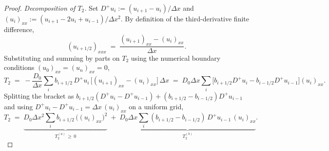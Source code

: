 \documentclass[10pt,a4paper]{amsart}
\begin{document}
\begin{proof}
    \emph{Decomposition of $T_2$.}
    Set $D^+ u_i := (u_{i+1} - u_i)/\Delta x$ and $(u_i)_{xx} := (u_{i+1} - 2u_i + u_{i-1})/\Delta x^2$. By definition of the third-derivative finite difference,
    \begin{equation}
        (u_{i+1/2})_{xxx} \;=\; \frac{(u_{i+1})_{xx} - (u_i)_{xx}}{\Delta x}.
    \end{equation}
    Substituting and summing by parts on $T_2$ using the numerical boundary conditions $(u_0)_{xx} = (u_n)_{xx} = 0$,
    \begin{equation}
        T_2 \;=\; -\frac{D_0}{\Delta x} \sum_i b_{i+1/2}\, D^+ u_i\, \big[(u_{i+1})_{xx} - (u_i)_{xx}\big]\,\Delta x \;=\; D_0 \Delta x \sum_i \big[b_{i+1/2} D^+ u_i - b_{i-1/2} D^+ u_{i-1}\big](u_i)_{xx}.
    \end{equation}
    Splitting the bracket as $b_{i+1/2}(D^+ u_i - D^+ u_{i-1}) + (b_{i+1/2} - b_{i-1/2}) D^+ u_{i-1}$ and using $D^+ u_i - D^+ u_{i-1} = \Delta x\, (u_i)_{xx}$ on a uniform grid,
    \begin{equation}
        T_2 \;=\; \underbrace{D_0 \Delta x^2 \sum_i b_{i+1/2}\, \big((u_i)_{xx}\big)^2}_{T_2^{(a)} \,\geq\, 0} \;+\; \underbrace{D_0 \Delta x \sum_i (b_{i+1/2} - b_{i-1/2})\, D^+ u_{i-1}\, (u_i)_{xx}}_{T_2^{(b)}}. \label{eq:t2-decomp}
    \end{equation}


\end{proof}
\end{document}
